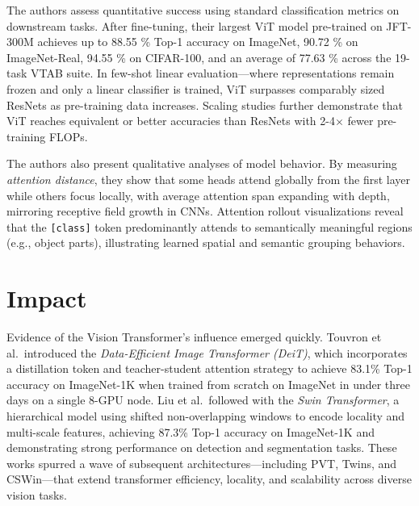 \documentclass[10pt]{article}
\begin{document}
The authors assess quantitative success using standard classification metrics on downstream tasks. After fine-tuning, their largest ViT model pre-trained on JFT-300M achieves up to 88.55 \% Top-1 accuracy on ImageNet, 90.72 \% on ImageNet-Real, 94.55 \% on CIFAR-100, and an average of 77.63 \% across the 19-task VTAB suite. In few-shot linear evaluation—where representations remain frozen and only a linear classifier is trained, ViT surpasses comparably sized ResNets as pre-training data increases. Scaling studies further demonstrate that ViT reaches equivalent or better accuracies than ResNets with 2-4\(\times\) fewer pre-training FLOPs.

The authors also present qualitative analyses of model behavior. By measuring \textit{attention distance}, they show that some heads attend globally from the first layer while others focus locally, with average attention span expanding with depth, mirroring receptive field growth in CNNs. Attention rollout visualizations reveal that the \texttt{[class]} token predominantly attends to semantically meaningful regions (e.g., object parts), illustrating learned spatial and semantic grouping behaviors.


\section*{Impact}
Evidence of the Vision Transformer's influence emerged quickly. Touvron et al.\ introduced the \emph{Data-Efficient Image Transformer (DeiT)}\cite{DBLP:journals/corr/abs-2012-12877}, which incorporates a distillation token and teacher-student attention strategy to achieve 83.1\% Top-1 accuracy on ImageNet-1K when trained from scratch on ImageNet in under three days on a single 8-GPU node. Liu et al.\ followed with the \emph{Swin Transformer}\cite{DBLP:journals/corr/abs-2103-14030}, a hierarchical model using shifted non-overlapping windows to encode locality and multi-scale features, achieving 87.3\% Top-1 accuracy on ImageNet-1K and demonstrating strong performance on detection and segmentation tasks. These works spurred a wave of subsequent architectures—including PVT\cite{DBLP:journals/corr/abs-2102-12122}, Twins\cite{DBLP:journals/corr/abs-2104-13840}, and CSWin\cite{DBLP:journals/corr/abs-2107-00652}—that extend transformer efficiency, locality, and scalability across diverse vision tasks.




\end{document}
